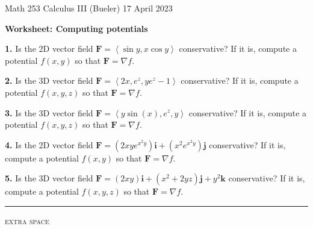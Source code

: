 \documentclass[11pt]{amsart}
\newcommand{\bF}{\mathbf{F}}
\newcommand{\bi}{\mathbf{i}}
\newcommand{\bj}{\mathbf{j}}
\newcommand{\bk}{\mathbf{k}}
\newcommand{\grad}{\nabla}
\newcommand{\prob}[1]{\bigskip\noindent\textbf{#1.}\quad }
\begin{document}
\scriptsize \noindent Math 253 Calculus III (Bueler) \hfill 17 April 2023 
\normalsize\medskip

\Large\centerline{\textbf{Worksheet: Computing potentials}}
\medskip
\normalsize

\thispagestyle{empty}

\bigskip

\prob{1}  Is the 2D vector field $\bF=\left<\sin y, x\cos y\right>$ conservative?  If it is, compute a potential $f(x,y)$ so that $\bF = \grad f$.
\vfill

\prob{2}  Is the 3D vector field $\bF=\left<2x,e^z,ye^z-1\right>$ conservative?  If it is, compute a potential $f(x,y,z)$ so that $\bF = \grad f$.
\vfill

\prob{3}  Is the 3D vector field $\bF=\left<y \sin(x),e^z,y\right>$ conservative?  If it is, compute a potential $f(x,y,z)$ so that $\bF = \grad f$.
\vfill

\clearpage\newpage
\prob{4}  Is the 2D vector field $\bF=(2xye^{x^2y}) \bi + (x^2 e^{x^2 y}) \bj$ conservative?  If it is, compute a potential $f(x,y)$ so that $\bF = \grad f$.
\vfill

\prob{5}  Is the 3D vector field $\bF=(2xy) \bi + (x^2 + 2 y z) \bj + y^2 \bk$ conservative?  If it is, compute a potential $f(x,y,z)$ so that $\bF = \grad f$.
\vfill

\noindent \hrule

\bigskip
\centerline{\footnotesize \textsc{extra space}}
\vfill
\end{document}
